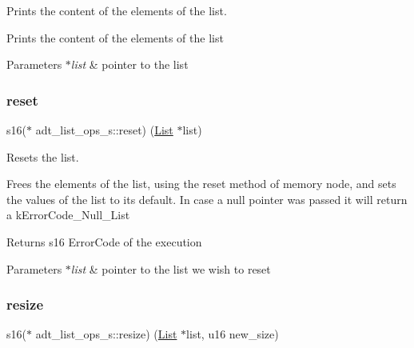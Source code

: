 Prints the content of the elements of the list. 

Prints the content of the elements of the list


\begin{DoxyParams}{Parameters}
{\em $\ast$list} & pointer to the list \\
\hline
\end{DoxyParams}
\mbox{\label{structadt__list__ops__s_a3160882c20d8d31c006da0d9908a6931}} 
\subsubsection{\texorpdfstring{reset}{reset}}
{\footnotesize\ttfamily s16($\ast$ adt\+\_\+list\+\_\+ops\+\_\+s\+::reset) (\hyperlink{structadt__list__s}{List} $\ast$list)}



Resets the list. 

Frees the elements of the list, using the reset method of memory node, and sets the values of the list to it\textquotesingle{}s default. In case a null pointer was passed it will return a k\+Error\+Code\+\_\+\+Null\+\_\+\+List

\begin{DoxyReturn}{Returns}
s16 Error\+Code of the execution 
\end{DoxyReturn}

\begin{DoxyParams}{Parameters}
{\em $\ast$list} & pointer to the list we wish to reset \\
\hline
\end{DoxyParams}
\mbox{\label{structadt__list__ops__s_acdcd86caebe642ecbe5abb61cde2d896}} 
\subsubsection{\texorpdfstring{resize}{resize}}
{\footnotesize\ttfamily s16($\ast$ adt\+\_\+list\+\_\+ops\+\_\+s\+::resize) (\hyperlink{structadt__list__s}{List} $\ast$list, u16 new\+\_\+size)}



